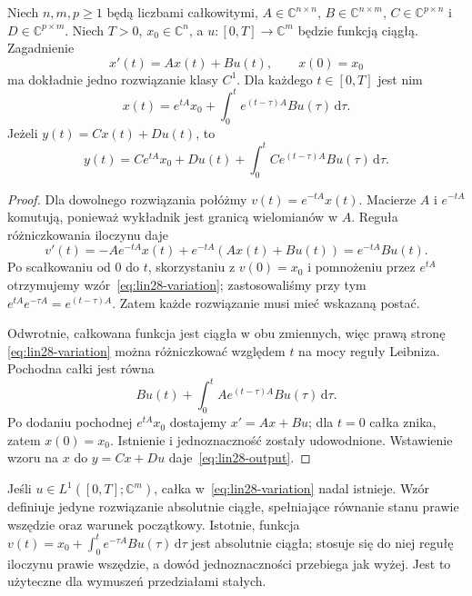 \begin{twierdzenie}
\label{thm:lin28-variation}
Niech \(n,m,p\ge1\) będą liczbami całkowitymi,
\(A\in\mathbb C^{n\times n}\),
\(B\in\mathbb C^{n\times m}\),
\(C\in\mathbb C^{p\times n}\)
i \(D\in\mathbb C^{p\times m}\).
Niech \(T>0\), \(x_0\in\mathbb C^n\), a
\(u\colon[0,T]\to\mathbb C^m\) będzie funkcją ciągłą.
Zagadnienie
\[
 x'(t)=Ax(t)+Bu(t),\qquad x(0)=x_0
\]
ma dokładnie jedno rozwiązanie klasy \(C^1\).
Dla każdego \(t\in[0,T]\) jest nim
\[
 x(t)=e^{tA}x_0+
        \int_0^t e^{(t-\tau)A}Bu(\tau)\,\mathrm d\tau.
 \tag{28.1}\label{eq:lin28-variation}
\]
Jeżeli \(y(t)=Cx(t)+Du(t)\), to
\[
 y(t)=Ce^{tA}x_0+Du(t)+
       \int_0^t Ce^{(t-\tau)A}Bu(\tau)\,\mathrm d\tau.
 \tag{28.2}\label{eq:lin28-output}
\]
\end{twierdzenie}
\begin{proof}
Dla dowolnego rozwiązania połóżmy
\(v(t)=e^{-tA}x(t)\).
Macierze \(A\) i \(e^{-tA}\) komutują, ponieważ
wykładnik jest granicą wielomianów w \(A\).
Reguła różniczkowania iloczynu daje
\[
 v'(t)=-Ae^{-tA}x(t)+e^{-tA}(Ax(t)+Bu(t))
      =e^{-tA}Bu(t).
\]
Po scałkowaniu od \(0\) do \(t\), skorzystaniu
z \(v(0)=x_0\) i pomnożeniu przez \(e^{tA}\)
otrzymujemy wzór~\eqref{eq:lin28-variation};
zastosowaliśmy przy tym
\(e^{tA}e^{-\tau A}=e^{(t-\tau)A}\).
Zatem każde rozwiązanie musi mieć wskazaną postać.

Odwrotnie, całkowana funkcja jest ciągła
w obu zmiennych, więc prawą stronę
\eqref{eq:lin28-variation} można różniczkować
względem \(t\) na mocy reguły Leibniza.
Pochodna całki jest równa
\[
 Bu(t)+\int_0^t Ae^{(t-\tau)A}Bu(\tau)\,\mathrm d\tau.
\]
Po dodaniu pochodnej \(e^{tA}x_0\)
dostajemy \(x'=Ax+Bu\);
dla \(t=0\) całka znika, zatem \(x(0)=x_0\).
Istnienie i jednoznaczność zostały udowodnione.
Wstawienie wzoru na \(x\) do \(y=Cx+Du\)
daje~\eqref{eq:lin28-output}.
\end{proof}

\begin{uwaga}
\label{rem:lin28-integrable}
Jeśli \(u\in L^1([0,T];\mathbb C^m)\), całka
w~\eqref{eq:lin28-variation} nadal istnieje.
Wzór definiuje jedyne rozwiązanie absolutnie ciągłe,
spełniające równanie stanu prawie wszędzie
oraz warunek początkowy.
Istotnie, funkcja \(v(t)=x_0+\int_0^t e^{-\tau A}Bu(\tau)
\,\mathrm d\tau\) jest absolutnie ciągła;
stosuje się do niej regułę iloczynu prawie wszędzie,
a dowód jednoznaczności przebiega jak wyżej.
Jest to użyteczne dla wymuszeń przedziałami stałych.
\end{uwaga}

